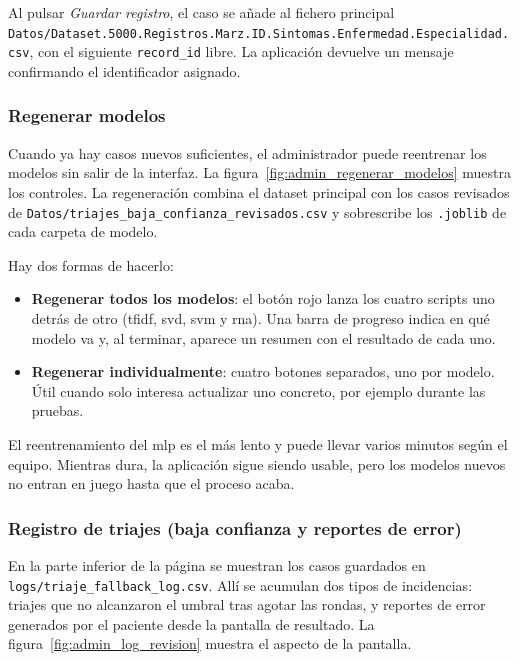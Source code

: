 Al pulsar \textit{Guardar registro}, el caso se añade al fichero principal \texttt{Datos/Dataset.5000.Registros.Marz.ID.Sintomas.Enfermedad.Especialidad.csv}, con el siguiente \texttt{record\_id} libre. La aplicación devuelve un mensaje confirmando el identificador asignado.

\subsubsection*{Regenerar modelos}

Cuando ya hay casos nuevos suficientes, el administrador puede reentrenar los modelos sin salir de la interfaz. La figura~\ref{fig:admin_regenerar_modelos} muestra los controles. La regeneración combina el dataset principal con los casos revisados de \texttt{Datos/triajes\_baja\_confianza\_revisados.csv} y sobrescribe los \texttt{.joblib} de cada carpeta de modelo.


Hay dos formas de hacerlo:

\begin{itemize}
	\item \textbf{Regenerar todos los modelos}: el botón rojo lanza los cuatro scripts uno detrás de otro (\acrshort{tfidf}, \acrshort{svd}, \acrshort{svm} y \acrshort{rna}). Una barra de progreso indica en qué modelo va y, al terminar, aparece un resumen con el resultado de cada uno.
	\item \textbf{Regenerar individualmente}: cuatro botones separados, uno por modelo. Útil cuando solo interesa actualizar uno concreto, por ejemplo durante las pruebas.
\end{itemize}

El reentrenamiento del \acrshort{mlp} es el más lento y puede llevar varios minutos según el equipo. Mientras dura, la aplicación sigue siendo usable, pero los modelos nuevos no entran en juego hasta que el proceso acaba.

\subsubsection*{Registro de triajes (baja confianza y reportes de error)}

En la parte inferior de la página se muestran los casos guardados en \texttt{logs/triaje\_fallback\_log.csv}. Allí se acumulan dos tipos de incidencias: triajes que no alcanzaron el umbral tras agotar las rondas, y reportes de error generados por el paciente desde la pantalla de resultado. La figura~\ref{fig:admin_log_revision} muestra el aspecto de la pantalla.

